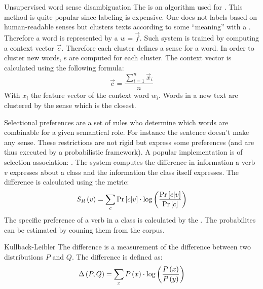 \begin{df}{Unsupervised word sense disambiguation}
The \sb{} is an algorithm used for . This method is quite popular since labeling is expensive. One does not labels based on human-readable senses but clusters texts according to some ``meaning'' with a . Therefore a word is represented by a  $w=\vec{f}$. Such system is trained by computing a context vector $\vec{c}$. Therefore each cluster defines a sense for a word. In order to cluster new words, s are computed for each cluster. The context vector is calculated using the following formula:
\begin{equation}
\vec{c}=\displaystyle\frac{\displaystyle\sum_{i=1}^{n}\vec{x}_i}{n}
\end{equation}
With $x_i$ the feature vector of the context word $w_i$. Words in a new text are clustered by the sense which  is the closest.
\end{df}
\begin{df}{Selectional preferences}
\sb{} are a set of rules who determine which words are combinable for a given semantical role. For instance the sentence  doesn't make any sense. These restrictions are not rigid but express some preferences (and are thus executed by a probabilistic framework). A popular implementation is  of selection association: . The system computes the difference in information a verb $v$ expresses about a class and the information the class itself expresses. The difference is calculated using the  metric:
\begin{equation}
S_R\left(v\right)=\displaystyle\sum_c\Pr\left[c|v\right]\cdot\log\left(\displaystyle\frac{\Pr\left[c|v\right]}{\Pr\left[c\right]}\right)
\end{equation}
The specific preference of a verb in a class is calculated by the . The probabilites can be estimated by couning them from the corpus.
\end{df}
\begin{df}{Kullback-Leibler}
The \sb{} difference is a measurement of the difference between two distributions $P$ and $Q$. The \sb{} difference is defined as:
\begin{equation}
\Delta\left(P,Q\right)=\displaystyle\sum_xP\left(x\right)\cdot\log\left(\displaystyle\frac{P\left(x\right)}{P\left(y\right)}\right)
\end{equation}
\end{df}
